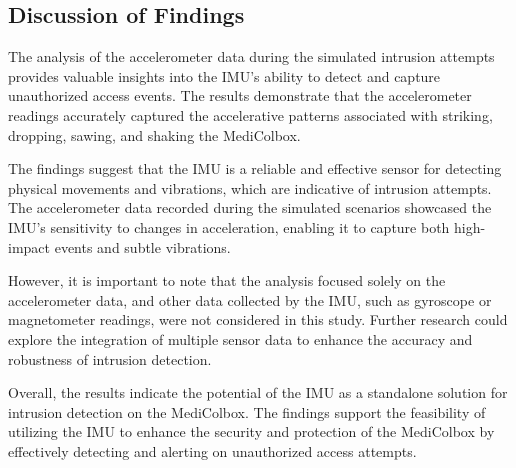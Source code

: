 \documentclass[../main.tex]{subfiles}
\begin{document}
\subsection{Discussion of Findings}

The analysis of the accelerometer data during the
simulated intrusion attempts provides valuable insights into the
IMU's ability to detect and capture unauthorized access events.
The results demonstrate that the
accelerometer readings accurately captured the
accelerative patterns associated with striking,
dropping, sawing, and shaking the MediColbox.

The findings suggest that the IMU is a reliable and
effective sensor for detecting physical movements and vibrations,
which are indicative of intrusion attempts.
The accelerometer data recorded during the
simulated scenarios showcased the IMU's sensitivity to
changes in acceleration,
enabling it to capture both high-impact events and
subtle vibrations.

However, it is important to note that the analysis
focused solely on the accelerometer data,
and other data collected by the IMU,
such as gyroscope or magnetometer readings,
were not considered in this study.
Further research could explore the
integration of multiple sensor data to enhance the
accuracy and robustness of intrusion detection.

Overall, the results indicate the potential of the IMU as
a standalone solution for intrusion detection on the
MediColbox. The findings support the feasibility of
utilizing the IMU to enhance the security and protection of the
MediColbox by effectively detecting and alerting on
unauthorized access attempts.
\end{document}
